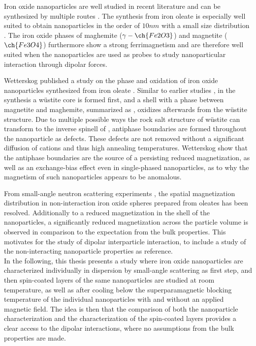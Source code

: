 \documentclass[\main/dresen_thesis.tex]{subfiles}
\begin{document}
  Iron oxide nanoparticles are well studied in recent literature and can be synthesized by multiple routes \cite{Laurent_2008_Magne}.
  The synthesis from iron oleate \cite{Hyeon_2003_Chemi} is especially well suited to obtain nanoparticles in the order of $10 \unit{nm}$ with a small size distribution \cite{Wetterskog_2014_Preci}.
  The iron oxide phases of maghemite ($\gamma-\ch{Fe2O3}$) and magnetite ($\ch{Fe3O4}$) furthermore show a strong ferrimagnetism and are therefore well suited when the nanoparticles are used as probes to study nanoparticular interaction through dipolar forces.

  Wetterskog \etal published a study on the phase and oxidation of iron oxide nanoparticles synthesized from iron oleate \cite{Wetterskog_2013_Anoma}.
  Similar to earlier studies \cite{Hai_2010_Sizec, Chen_2010_Chara}, in the synthesis a w\"ustite core is formed first, and a shell with a phase between magnetite and maghemite, summarized as , oxidizes afterwards from the w\"ustite structure.
  Due to multiple possible ways the rock salt structure of w\"ustite can transform to the inverse spinell of , antiphase boundaries are formed throughout the nanoparticle as defects.
  These defects are not removed without a significant diffusion of cations \cite{Margulies_1997_Origi} and thus high annealing temperatures.
  Wetterskog \etal show that the antiphase boundaries are the source of a persisting reduced magnetization, as well as an exchange-bias effect even in single-phased nanoparticles, as to why the magnetism of such nanoparticles appears to be anomalous.

  From small-angle neutron scattering experiments \cite{Disch_2012_Quant}, the spatial magnetization distribution in non-interaction iron oxide spheres prepared from oleates has been resolved.
  Additionally to a reduced magnetization in the shell of the nanoparticles, a significantly reduced magnetization across the particle volume is observed in comparison to the expectation from the bulk properties.
  This motivates for the study of dipolar interparticle interaction, to include a study of the non-interacting nanoparticle properties as reference.
  \\

  In the following, this thesis presents a study where iron oxide nanoparticles are characterized individually in dispersion by small-angle scattering as first step, and then spin-coated layers of the same nanoparticles are studied at room temperature, as well as after cooling below the superparamagnetic blocking temperature of the individual nanoparticles with and without an applied magnetic field.
  The idea is then that the comparison of both the nanoparticle characterization and the characterization of the spin-coated layers provides a clear access to the dipolar interactions, where no assumptions from the bulk properties are made.
\end{document}
